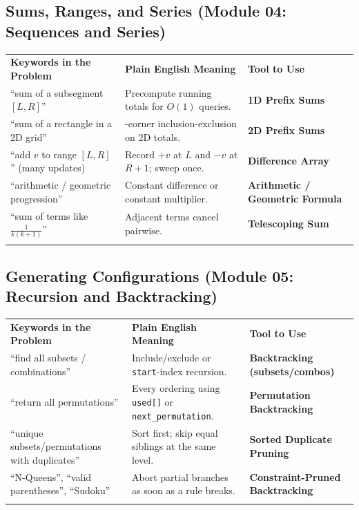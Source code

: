 \documentclass[11pt,a4paper]{article}
\begin{document}
\subsection{Sums, Ranges, and Series (Module 04: Sequences and Series)}
\begingroup\footnotesize{}
\begin{tabularx}{\textwidth}{>{\raggedright\arraybackslash}p{4.4cm} >{\raggedright\arraybackslash}X >{\raggedright\arraybackslash\bfseries}p{4.0cm}}
\arrayrulecolor{primaryblue}\toprule[1.1pt]
\rowcolor{primaryblue!10}
\textcolor{primaryblue}{\textbf{Keywords in the Problem}} & \textcolor{primaryblue}{\textbf{Plain English Meaning}} & \textcolor{primaryblue}{\textbf{Tool to Use}} \\
\arrayrulecolor{codeframe}\midrule[0.6pt]
``sum of a subsegment $[L, R]$'' & Precompute running totals for $O(1)$ queries. & 1D Prefix Sums \\
``sum of a rectangle in a 2D grid'' & 4-corner inclusion-exclusion on 2D totals. & 2D Prefix Sums \\
``add $v$ to range $[L, R]$'' (many updates) & Record $+v$ at $L$ and $-v$ at $R+1$; sweep once. & Difference Array \\
``arithmetic / geometric progression'' & Constant difference or constant multiplier. & Arithmetic / Geometric Formula \\
``sum of terms like $\frac{1}{k(k+1)}$'' & Adjacent terms cancel pairwise. & Telescoping Sum \\
\arrayrulecolor{primaryblue}\bottomrule[1.1pt]
\end{tabularx}\endgroup

\subsection{Generating Configurations (Module 05: Recursion and Backtracking)}
\begingroup\footnotesize{}
\begin{tabularx}{\textwidth}{>{\raggedright\arraybackslash}p{4.4cm} >{\raggedright\arraybackslash}X >{\raggedright\arraybackslash\bfseries}p{4.0cm}}
\arrayrulecolor{primaryblue}\toprule[1.1pt]
\rowcolor{primaryblue!10}
\textcolor{primaryblue}{\textbf{Keywords in the Problem}} & \textcolor{primaryblue}{\textbf{Plain English Meaning}} & \textcolor{primaryblue}{\textbf{Tool to Use}} \\
\arrayrulecolor{codeframe}\midrule[0.6pt]
``find all subsets / combinations'' & Include/exclude or \texttt{start}-index recursion. & Backtracking (subsets/combos) \\
``return all permutations'' & Every ordering using \texttt{used[]} or \texttt{next\_permutation}. & Permutation Backtracking \\
``unique subsets/permutations with duplicates'' & Sort first; skip equal siblings at the same level. & Sorted Duplicate Pruning \\
``N-Queens'', ``valid parentheses'', ``Sudoku'' & Abort partial branches as soon as a rule breaks. & Constraint-Pruned Backtracking \\
\arrayrulecolor{primaryblue}\bottomrule[1.1pt]
\end{tabularx}\endgroup
\end{document}
